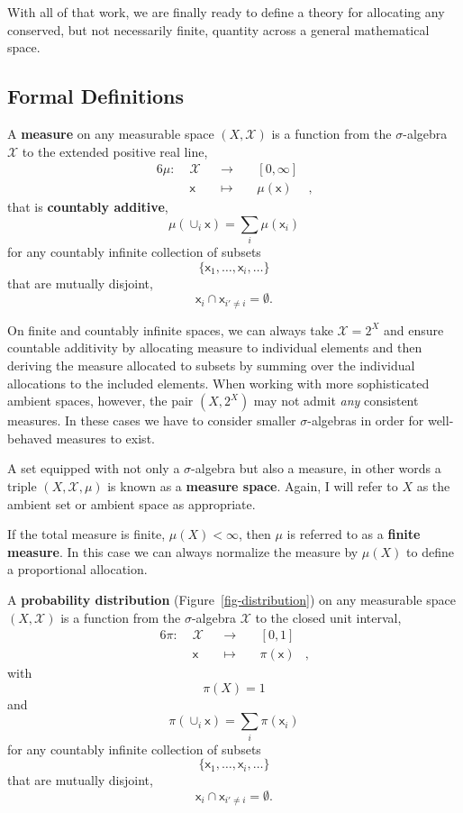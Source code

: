 \documentclass[
  letterpaper,
  DIV=11,
  numbers=noendperiod]{scrartcl}
\begin{document}
With all of that work, we are finally ready to define a theory for
allocating any conserved, but not necessarily finite, quantity across a
general mathematical space.

\subsection{Formal Definitions}\label{formal-definitions}

A \textbf{measure} on any measurable space \((X, \mathcal{X})\) is a
function from the \(\sigma\)-algebra \(\mathcal{X}\) to the extended
positive real line, \begin{alignat*}{6}
\mu :\; & \mathcal{X} & &\rightarrow& \; & [0, \infty] &
\\
& \mathsf{x} & &\mapsto& & \mu(\mathsf{x}) &,
\end{alignat*} that is \textbf{countably additive}, \[
\mu( \cup_{i} \mathsf{x} ) = \sum_{i} \mu( \mathsf{x}_{i} )
\] for any countably infinite collection of subsets \[
\{ \mathsf{x}_{1}, \ldots, \mathsf{x}_{i}, \ldots \}
\] that are mutually disjoint, \[
\mathsf{x}_{i} \cap \mathsf{x}_{i' \ne i} = \emptyset.
\]

On finite and countably infinite spaces, we can always take
\(\mathcal{X} = 2^{X}\) and ensure countable additivity by allocating
measure to individual elements and then deriving the measure allocated
to subsets by summing over the individual allocations to the included
elements. When working with more sophisticated ambient spaces, however,
the pair \((X, 2^{X})\) may not admit \emph{any} consistent measures. In
these cases we have to consider smaller \(\sigma\)-algebras in order for
well-behaved measures to exist.

A set equipped with not only a \(\sigma\)-algebra but also a measure, in
other words a triple \((X, \mathcal{X}, \mu)\) is known as a
\textbf{measure space}. Again, I will refer to \(X\) as the ambient set
or ambient space as appropriate.

If the total measure is finite, \(\mu(X) < \infty\), then \(\mu\) is
referred to as a \textbf{finite measure}. In this case we can always
normalize the measure by \(\mu(X)\) to define a proportional allocation.

A \textbf{probability distribution} (Figure~\ref{fig-distribution}) on
any measurable space \((X, \mathcal{X})\) is a function from the
\(\sigma\)-algebra \(\mathcal{X}\) to the closed unit interval,
\begin{alignat*}{6}
\pi :\; & \mathcal{X} & &\rightarrow& \; & [0, 1] &
\\
& \mathsf{x} & &\mapsto& & \pi(\mathsf{x}) &,
\end{alignat*} with \[
\pi(X) = 1
\] and \[
\pi( \cup_{i} \mathsf{x} ) = \sum_{i} \pi( \mathsf{x}_{i} )
\] for any countably infinite collection of subsets \[
\{ \mathsf{x}_{1}, \ldots, \mathsf{x}_{i}, \ldots \}
\] that are mutually disjoint, \[
\mathsf{x}_{i} \cap \mathsf{x}_{i' \ne i} = \emptyset.
\]
\end{document}
